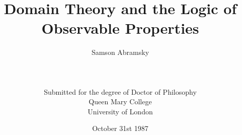 \documentclass[fleqn,12pt]{report}
\begin{document}
\title{Domain Theory and the Logic of Observable Properties}
\author{Samson Abramsky\\
\\
\\
\\
Submitted for the degree of Doctor of Philosophy\\
Queen Mary College\\
University of London}
\date{October 31st 1987}































\end{document}
